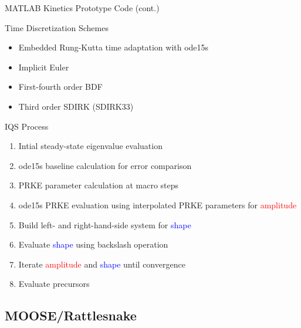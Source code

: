 \documentclass[8pt,xcolor=dvipnames]{beamer}
\newcommand{\tcr}[1]{\textcolor{red}{#1}}
\newcommand{\tcb}[1]{\textcolor{blue}{#1}}
\begin{document}
\begin{frame}{MATLAB Kinetics Prototype Code (cont.)}

\begin{block}{Time Discretization Schemes}
\begin{itemize}
\item Embedded Rung-Kutta time adaptation with ode15s
\item Implicit Euler
\item First-fourth order BDF
\item Third order SDIRK (SDIRK33)
\end{itemize}
\end{block}

\begin{block}{IQS Process}
\begin{enumerate}
\item Intial steady-state eigenvalue evaluation
\item ode15s baseline calculation for error comparison
\item PRKE parameter calculation at macro steps
\item ode15s PRKE evaluation using interpolated PRKE parameters for \tcr{amplitude}
\item Build left- and right-hand-side system for \tcb{shape}
\item Evaluate \tcb{shape} using backslash operation
\item Iterate \tcr{amplitude} and \tcb{shape} until convergence
\item Evaluate precursors
\end{enumerate}
\end{block}

\end{frame}

\subsection{MOOSE/Rattlesnake}
\end{document}
